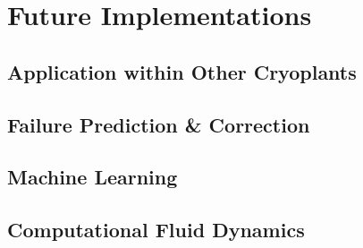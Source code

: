 \chapter{Future Implementations}
\section{Application within Other Cryoplants}
\section{Failure Prediction \& Correction}
\section{Machine Learning}
\section{Computational Fluid Dynamics}